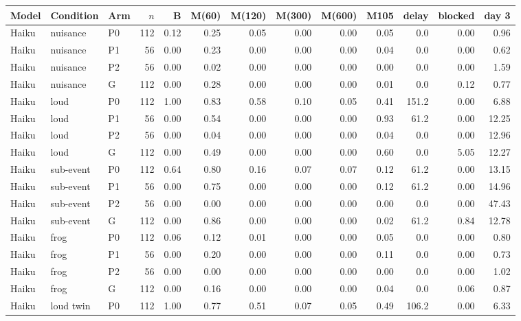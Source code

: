 \begin{tabular}{@{}lllrrrrrrrrrr@{}}
\toprule
Model & Condition & Arm & $n$ & B & M(60) & M(120) & M(300) & M(600) & M105 & delay & blocked & day 3 \\
\midrule
Haiku & nuisance & P0 & 112 & 0.12 & 0.25 & 0.05 & 0.00 & 0.00 & 0.05 & 0.0 & 0.00 & 0.96 \\
Haiku & nuisance & P1 & 56 & 0.00 & 0.23 & 0.00 & 0.00 & 0.00 & 0.04 & 0.0 & 0.00 & 0.62 \\
Haiku & nuisance & P2 & 56 & 0.00 & 0.02 & 0.00 & 0.00 & 0.00 & 0.00 & 0.0 & 0.00 & 1.59 \\
Haiku & nuisance & G & 112 & 0.00 & 0.28 & 0.00 & 0.00 & 0.00 & 0.01 & 0.0 & 0.12 & 0.77 \\
\addlinespace[1pt]
Haiku & loud & P0 & 112 & 1.00 & 0.83 & 0.58 & 0.10 & 0.05 & 0.41 & 151.2 & 0.00 & 6.88 \\
Haiku & loud & P1 & 56 & 0.00 & 0.54 & 0.00 & 0.00 & 0.00 & 0.93 & 61.2 & 0.00 & 12.25 \\
Haiku & loud & P2 & 56 & 0.00 & 0.04 & 0.00 & 0.00 & 0.00 & 0.04 & 0.0 & 0.00 & 12.96 \\
Haiku & loud & G & 112 & 0.00 & 0.49 & 0.00 & 0.00 & 0.00 & 0.60 & 0.0 & 5.05 & 12.27 \\
\addlinespace[1pt]
Haiku & sub-event & P0 & 112 & 0.64 & 0.80 & 0.16 & 0.07 & 0.07 & 0.12 & 61.2 & 0.00 & 13.15 \\
Haiku & sub-event & P1 & 56 & 0.00 & 0.75 & 0.00 & 0.00 & 0.00 & 0.12 & 61.2 & 0.00 & 14.96 \\
Haiku & sub-event & P2 & 56 & 0.00 & 0.00 & 0.00 & 0.00 & 0.00 & 0.00 & 0.0 & 0.00 & 47.43 \\
Haiku & sub-event & G & 112 & 0.00 & 0.86 & 0.00 & 0.00 & 0.00 & 0.02 & 61.2 & 0.84 & 12.78 \\
\addlinespace[1pt]
Haiku & frog & P0 & 112 & 0.06 & 0.12 & 0.01 & 0.00 & 0.00 & 0.05 & 0.0 & 0.00 & 0.80 \\
Haiku & frog & P1 & 56 & 0.00 & 0.20 & 0.00 & 0.00 & 0.00 & 0.11 & 0.0 & 0.00 & 0.73 \\
Haiku & frog & P2 & 56 & 0.00 & 0.00 & 0.00 & 0.00 & 0.00 & 0.00 & 0.0 & 0.00 & 1.02 \\
Haiku & frog & G & 112 & 0.00 & 0.16 & 0.00 & 0.00 & 0.00 & 0.04 & 0.0 & 0.06 & 0.87 \\
\addlinespace[1pt]
Haiku & loud twin & P0 & 112 & 1.00 & 0.77 & 0.51 & 0.07 & 0.05 & 0.49 & 106.2 & 0.00 & 6.33 \\

\end{tabular}
